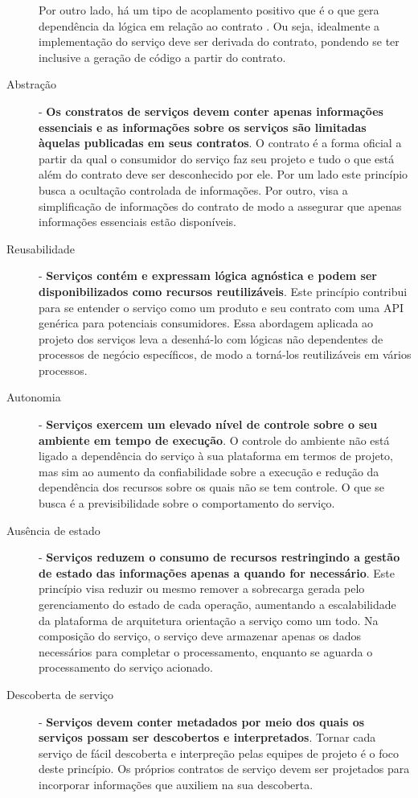 \begin{description}
Por outro lado, há um tipo de acoplamento positivo que é o que gera dependência
da lógica em relação ao contrato \cite{erl2009web}. Ou seja, idealmente a
implementação do serviço deve ser derivada do contrato, pondendo se ter inclusive a geração de código a
partir do contrato.


\item[Abstração] - \textbf{Os constratos de serviços devem conter apenas
informações essenciais e as informações sobre os serviços são limitadas àquelas
publicadas em seus contratos}. O contrato é a forma oficial a partir da qual o
consumidor do serviço faz seu projeto e tudo o que está além do contrato deve
ser desconhecido por ele. Por um lado este princípio busca a ocultação
controlada de informações. Por outro, visa a simplificação de informações do
contrato de modo a assegurar que apenas informações essenciais estão
disponíveis.


\item[Reusabilidade]- \textbf{Serviços contém e expressam lógica agnóstica e
podem ser disponibilizados como recursos reutilizáveis}. Este princípio
contribui para se entender o serviço como um produto e seu contrato com uma API
genérica para potenciais consumidores. Essa abordagem aplicada ao projeto dos
serviços leva a desenhá-lo com lógicas não dependentes de processos de negócio
específicos, de modo a torná-los reutilizáveis em vários processos.

\item[Autonomia]- \textbf{Serviços exercem um elevado nível de controle sobre
o seu ambiente em tempo de execução}. O controle do ambiente não está ligado a
dependência do serviço à sua plataforma em termos de projeto, mas sim ao aumento
da confiabilidade sobre a execução e redução da dependência dos recursos
sobre os quais não se tem controle.
O que se busca é a previsibilidade sobre o comportamento do serviço.

\item[Ausência de estado] - \textbf{Serviços reduzem o consumo de recursos
restringindo a gestão de estado das informações apenas a quando for necessário}.
Este princípio visa reduzir ou mesmo remover a sobrecarga gerada pelo
gerenciamento do estado de cada operação, aumentando a escalabilidade da
plataforma de arquitetura orientação a serviço como um todo. Na composição do
serviço, o serviço deve armazenar apenas os dados necessários para completar o
processamento, enquanto se aguarda o processamento do serviço acionado.

\item[Descoberta de serviço] - \textbf{Serviços devem conter metadados por meio
dos quais os serviços possam ser descobertos e interpretados}. Tornar cada
serviço de fácil descoberta e interpreção pelas equipes de projeto é o foco
deste princípio. Os próprios contratos de serviço devem ser projetados para
incorporar informações que auxiliem na sua descoberta.


\end{description}
